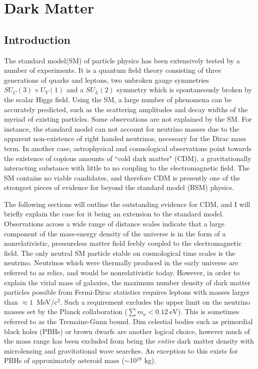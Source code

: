 \chapter{Dark Matter}

\section{Introduction}
The standard model(SM) of particle physics has been extensively tested by a number of experiments. 
It is a quantum field theory consisting of three generations of quarks and leptons, two unbroken gauge symmetries $SU_C(3) \times U_Y(1)$ and a $SU_L(2)$ symmetry which is spontaneously broken by the scalar Higgs field.
Using the SM, a large number of phenomena can be accurately predicted, such as the scattering amplitudes and decay widths of the myriad of existing particles.
Some observations are not explained by the SM.
For instance, the standard model can not account for neutrino masses due to the apparent non-existence of right handed neutrinos, necessary for the Dirac mass term.
In another case, astrophysical and cosmological observations point towards the existence of copious amounts of ``cold dark matter" (CDM), a gravitationally interacting substance with little to no coupling to the electromagnetic field\cite{bertone_history_2018}.
The SM contains no viable candidates, and therefore CDM is presently one of the strongest pieces of evidence for beyond the standard model (BSM) physics.

The following sections will outline the outstanding evidence for CDM, and I will briefly explain the case for it being an extension to the standard model.
Observations across a wide range of distance scales indicate that a large component of the mass-energy density of the universe is in the form of a nonrelativistic, pressureless matter field feebly coupled to the electromagnetic field.
The only neutral SM particle stable on cosmological time scales is the neutrino.
Neutrinos which were thermally produced in the early universe are referred to as relics, and would be nonrelativistic today.
However, in order to explain the virial mass of galaxies, the maximum number density of dark matter particles possible from Fermi-Dirac statistics requires leptons with masses larger than $\approx 1$~MeV/c$^2$\cite{tremaine_dynamical_1979}.
Such a requirement excludes the upper limit on the neutrino masses set by the Planck collaboration ($\sum m_\nu < 0.12\mathrm{~eV}$)\cite{planck_collaboration_planck_2020}.
This is sometimes referred to as the Tremaine-Gunn bound\cite{tremaine_dynamical_1979}.
Dim celestial bodies such as  primordial black holes (PBHs) or brown dwarfs are another logical choice, however much of the mass range has been excluded from being the \textit{entire} dark matter density with microlensing and gravitational wave searches\cite{villanueva-domingo_brief_2021}.
An exception to this exists for PBHs of approximately asteroid mass ($\sim$10$^{18}$ kg).

